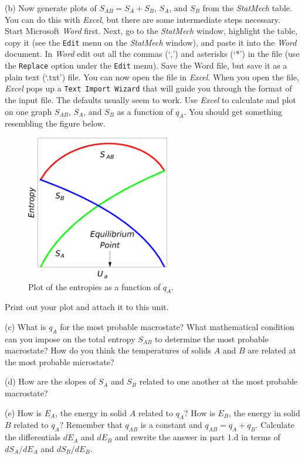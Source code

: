 (b) Now generate plots of $S_{AB}=S_A + S_B$, $S_A$, and $S_B$ from the {\it StatMech} table.
You can do this with {\it Excel}, but there are some intermediate steps necessary.
Start Microsoft {\it Word} first.
Next, go to the {\it StatMech} window, highlight the table, copy it
 (see the {\tt Edit} menu on the {\it StatMech} window), and paste it into the {\it Word}
document. 
In {\it Word} edit out all the commas (`,') and asterisks (`*') in the file 
(use the {\tt Replace}
option under the {\tt Edit} menu).
Save the Word file, but save it as a plain text (`\*.txt') file.
You can now open the file in {\it Excel}.
When you open the file, {\it Excel} pops up a {\tt Text Import Wizard} 
that will guide you through
the format of the input file.
The defaults usually seem to work.
Use {\it Excel} to calculate and plot on one graph $S_{AB}$, $S_A$, and $S_B$
as a function of $q_A$.
You should get something resembling the figure below.
\begin{figure}[hb!]
\begin{center}
\includegraphics[height=2.5in]{entropy_temperature/NumberOfStates5.eps}
\caption{Plot of the entropies as a function of $q_A$.}
\end{center}
\end{figure}
Print out your plot and attach it to this unit.

(c) What is $q_A$ for the most probable macrostate? What mathematical condition can you impose
on the total entropy $S_{AB}$ to determine the most probable macrostate?
How do you think the temperatures of solids $A$ and $B$ are related at the most probable 
microstate?
\vspace{15mm}

(d) How are the slopes of $S_A$ and $S_B$ related to one another at the most probable
macrostate?
\vspace{40mm}

(e) How is $E_A$, the energy in solid $A$ related to $q_A$?
How is $E_B$, the energy in solid $B$ related to $q_A$?
Remember that $q_{AB}$ is a constant and $q_{AB} = q_A + q_B$.
Calculate the differentials $dE_A$ and $dE_B$ and rewrite the answer in part 1.d
in terms of $dS_A/dE_A$ and $dS_B/dE_B$.
\vspace{55mm}

